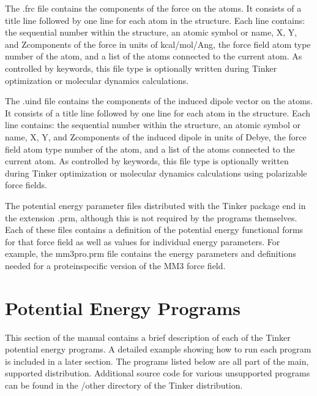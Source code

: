 \documentclass[letterpaper,11pt,english]{sphinxmanual}
\begin{document}
\sphinxAtStartPar
The .frc file contains the components of the force on the atoms. It consists of a title line followed by one line for each atom in the structure. Each line contains: the sequential number within the structure, an atomic symbol or name, X\sphinxhyphen{}, Y\sphinxhyphen{}, and Z\sphinxhyphen{}components of the force in units of kcal/mol/Ang, the force field atom type number of the atom, and a list of the atoms connected to the current atom. As controlled by keywords, this file type is optionally written during Tinker optimization or molecular dynamics calculations.

\sphinxAtStartPar
{}

\sphinxAtStartPar
The .uind file contains the components of the induced dipole vector on the atoms. It consists of a title line followed by one line for each atom in the structure. Each line contains: the sequential number within the structure, an atomic symbol or name, X\sphinxhyphen{}, Y\sphinxhyphen{}, and Z\sphinxhyphen{}components of the induced dipole in units of Debye, the force field atom type number of the atom, and a list of the atoms connected to the current atom. As controlled by keywords, this file type is optionally written during Tinker optimization or molecular dynamics calculations using polarizable force fields.

\sphinxAtStartPar
{}

\sphinxAtStartPar
The potential energy parameter files distributed with the Tinker package end in the extension .prm, although this is not required by the programs themselves. Each of these files contains a definition of the potential energy functional forms for that force field as well as values for individual energy parameters. For example, the mm3pro.prm file contains the energy parameters and definitions needed for a protein\sphinxhyphen{}specific version of the MM3 force field.

\sphinxstepscope


\chapter{Potential Energy Programs}
\label{\detokenize{text/energy-programs:potential-energy-programs}}\label{\detokenize{text/energy-programs::doc}}
\sphinxAtStartPar
This section of the manual contains a brief description of each of the Tinker potential energy programs. A detailed example showing how to run each program is included in a later section. The programs listed below are all part of the main, supported distribution. Additional source code for various unsupported programs can be found in the /other directory of the Tinker distribution.
\end{document}
